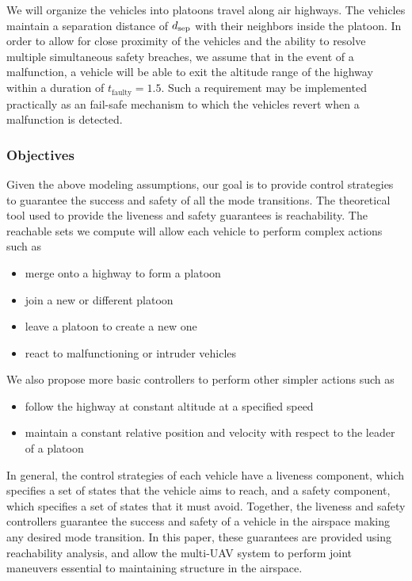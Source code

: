 We will organize the vehicles into platoons travel along air highways. The vehicles maintain a separation distance of $d_\text{sep}$ with their neighbors inside the platoon. In order to allow for close proximity of the vehicles and the ability to resolve multiple simultaneous safety breaches, we assume that in the event of a malfunction, a vehicle will be able to exit the altitude range of the highway within a duration of $t_\text{faulty}=1.5$. Such a requirement may be implemented practically as an fail-safe mechanism to which the vehicles revert when a malfunction is detected.

\subsubsection{Objectives}
Given the above modeling assumptions, our goal is to provide control strategies to guarantee the success and safety of all the mode transitions. The theoretical tool used to provide the liveness and safety guarantees is reachability. The reachable sets we compute will allow each vehicle to perform complex actions such as 


\begin{itemize}
\item merge onto a highway to form a platoon
\item join a new or different platoon
\item leave a platoon to create a new one
\item react to malfunctioning or intruder vehicles
\end{itemize}

We also propose more basic controllers to perform other simpler actions such as
\begin{itemize}
\item follow the highway at constant altitude at a specified speed
\item maintain a constant relative position and velocity with respect to the leader of a platoon
\end{itemize}

In general, the control strategies of each vehicle have a liveness component, which specifies a set of states that the vehicle aims to reach, and a safety component, which specifies a set of states that it must avoid. Together, the liveness and safety controllers guarantee the success and safety of a vehicle in the airspace making any desired mode transition. In this paper, these guarantees are provided using reachability analysis, and allow the multi-UAV system to perform joint maneuvers essential to maintaining structure in the airspace.
